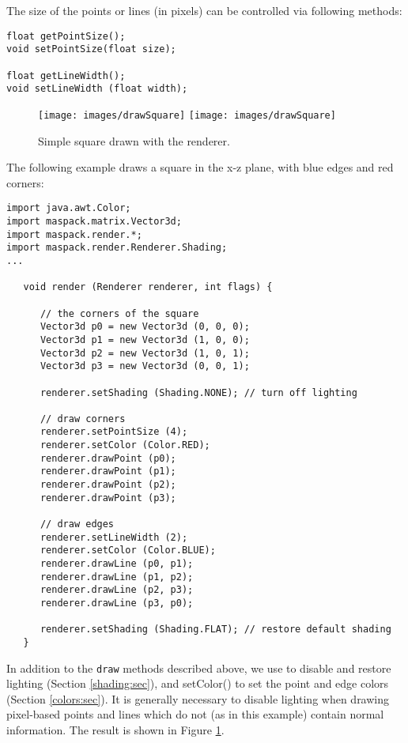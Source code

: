 The size of the points or lines (in pixels) can be controlled via
following methods:
%
\begin{lstlisting}[]
float getPointSize();
void setPointSize(float size);

float getLineWidth();
void setLineWidth (float width);
\end{lstlisting}
%
\begin{figure}[t]
\begin{center}
\iflatexml
 \texttt{[image: images/drawSquare]}
\else
 \texttt{[image: images/drawSquare]}
\fi
\end{center}
\caption{Simple square drawn with the renderer.}
\label{drawSquare:fig}
\end{figure}
%
The following example draws a square in the x-z plane, with blue edges
and red corners:
%
\begin{lstlisting}[]
import java.awt.Color;
import maspack.matrix.Vector3d;
import maspack.render.*;
import maspack.render.Renderer.Shading;
...

   void render (Renderer renderer, int flags) {
   
      // the corners of the square
      Vector3d p0 = new Vector3d (0, 0, 0);
      Vector3d p1 = new Vector3d (1, 0, 0);
      Vector3d p2 = new Vector3d (1, 0, 1);
      Vector3d p3 = new Vector3d (0, 0, 1);
   
      renderer.setShading (Shading.NONE); // turn off lighting
   
      // draw corners
      renderer.setPointSize (4);
      renderer.setColor (Color.RED);
      renderer.drawPoint (p0);
      renderer.drawPoint (p1);
      renderer.drawPoint (p2);
      renderer.drawPoint (p3);
   
      // draw edges
      renderer.setLineWidth (2);
      renderer.setColor (Color.BLUE);
      renderer.drawLine (p0, p1);
      renderer.drawLine (p1, p2);
      renderer.drawLine (p2, p3);
      renderer.drawLine (p3, p0);
   
      renderer.setShading (Shading.FLAT); // restore default shading
   }
\end{lstlisting}
%
In addition to the {\tt draw} methods described above, we use
 to disable and
restore lighting (Section \ref{shading:sec}), and
%
{setColor()} to set the point and edge colors (Section
\ref{colors:sec}). It is generally necessary to disable lighting when
drawing pixel-based points and lines which do not (as in this example)
contain normal information.  The result is shown in Figure
\ref{drawSquare:fig}.

